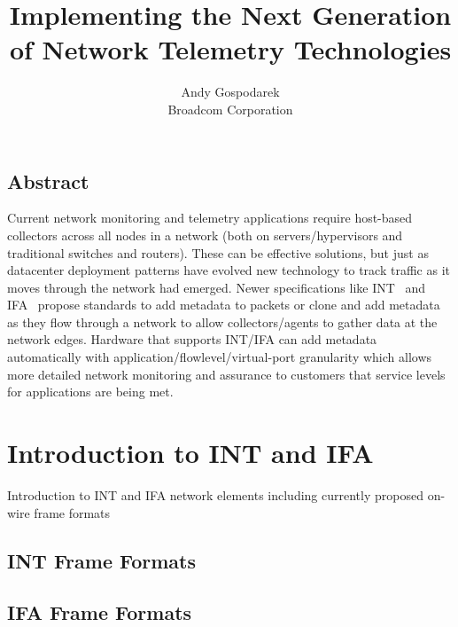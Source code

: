 \documentclass[letterpaper,twocolumn,10pt]{article}
\begin{document}
\date{}

\title{\Large \bf Implementing the Next Generation of Network
Telemetry Technologies}

\author{
{\rm Andy Gospodarek}\\
Broadcom Corporation
} %

\maketitle

\subsection*{Abstract}
Current network monitoring and telemetry applications require host-based
collectors across all nodes in a network (both on servers/hypervisors
and traditional switches and routers). These can be effective solutions,
but just as datacenter deployment patterns have evolved new technology
to track traffic as it moves through the network had emerged. Newer
specifications like INT~\cite{INT} and IFA~\cite{IFA} propose standards
to add metadata to packets or clone and add metadata as they flow
through a network to allow collectors/agents to gather data at the
network edges. Hardware that supports INT/IFA can add metadata
automatically with application/flowlevel/virtual-port granularity which
allows more detailed network monitoring and assurance to customers that
service levels for applications are being met.

\section{Introduction to INT and IFA}

Introduction to INT and IFA network elements including currently proposed on-wire frame formats

\subsection{INT Frame Formats}

\subsection{IFA Frame Formats}
\end{document}
